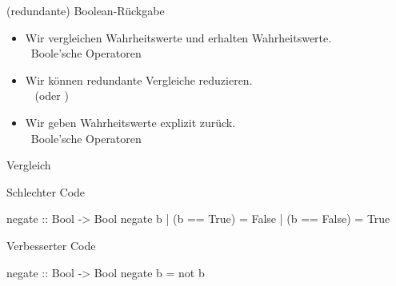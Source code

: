 \begin{frame}[fragile]{(redundante) Boolean-Rückgabe}
    \vspace{-\baselineskip}
    \begin{itemize}
        \item Wir vergleichen Wahrheitswerte und erhalten Wahrheitswerte.\\
            \faAngleRight~\alert{Boole'sche Operatoren}
        \item Wir können redundante Vergleiche reduzieren.\\
            \faAngleRight~\alert{ (oder )}
        \item<3-> Wir geben Wahrheitswerte explizit zurück.\\
        \faAngleRight~\alert{Boole'sche Operatoren}
    \end{itemize}
    \vspace{-1em}
\end{frame}
\begin{frame}[fragile]{Vergleich}\onslide<+->%
    \begin{block}{Schlechter Code\vphantom{g}}
        \begin{plainhaskell}
negate :: Bool -> Bool
negate b
    | (b == True)  = False
    | (b == False) = True
        \end{plainhaskell}
    \end{block}
    \begin{block}{Verbesserter Code\vphantom{g}}
        \begin{plainhaskell}
negate :: Bool -> Bool
negate b = not b
        \end{plainhaskell}
    \end{block}
\end{frame}